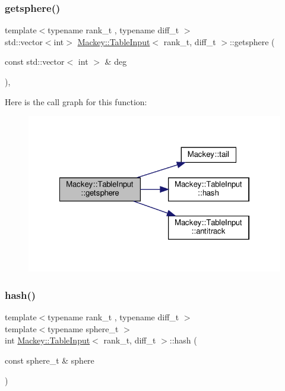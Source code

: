 \subsubsection{\texorpdfstring{getsphere()}{getsphere()}}
{\footnotesize\ttfamily template$<$typename rank\+\_\+t , typename diff\+\_\+t $>$ \\
std\+::vector$<$int$>$ \hyperlink{classMackey_1_1TableInput}{Mackey\+::\+Table\+Input}$<$ rank\+\_\+t, diff\+\_\+t $>$\+::getsphere (\begin{DoxyParamCaption}\item[{const std\+::vector$<$ int $>$ \&}]{deg }\end{DoxyParamCaption})\hspace{0.3cm}{\ttfamily [inline]}, {\ttfamily [protected]}}

Here is the call graph for this function\+:\nopagebreak
\begin{figure}[H]
\begin{center}
\leavevmode
\includegraphics[width=322pt]{classMackey_1_1TableInput_ace924319da8b66c82214a49277f9e3d3_cgraph}
\end{center}
\end{figure}
\mbox{\label{classMackey_1_1TableInput_aff13b1ef901103816a6ed49bae688629}} 
\subsubsection{\texorpdfstring{hash()}{hash()}}
{\footnotesize\ttfamily template$<$typename rank\+\_\+t , typename diff\+\_\+t $>$ \\
template$<$typename sphere\+\_\+t $>$ \\
int \hyperlink{classMackey_1_1TableInput}{Mackey\+::\+Table\+Input}$<$ rank\+\_\+t, diff\+\_\+t $>$\+::hash (\begin{DoxyParamCaption}\item[{const sphere\+\_\+t \&}]{sphere }\end{DoxyParamCaption})\hspace{0.3cm}{\ttfamily [protected]}}



